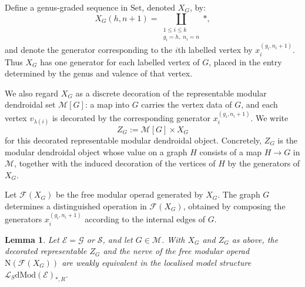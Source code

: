 \documentclass{amsart}
\newcommand{\bE}{\mathscr{E}}
\newcommand{\bM}{\mathscr{M}}
\newcommand{\sSet}{\mathscr{S}}
\newcommand{\Set}{\mathrm{Set}}
\newcommand{\Grpd}{\mathscr{G}}
\newcommand{\dMod}{\mathrm{dMod}}
\newcommand{\nerve}{\mathrm{N}}
\newtheorem{lemma}[theorem]{Lemma}%
\theoremstyle{definition}
\numberwithin{equation}{section}
\begin{document}
Define a genus-graded sequence in $\Set$, denoted $X_G$, by:
\[
X_G(h,n+1)
=
\coprod_{\substack{1\leq i\leq k\\ g_i=h,\; n_i=n}}
*,
\]
and denote the generator corresponding to the $i$th labelled vertex by $x_i^{(g_i,n_i+1)}$. Thus $X_G$ has one generator for each labelled vertex of $G$, placed in the entry determined by the genus and valence of that vertex.

We also regard $X_G$ as a discrete decoration of the representable modular dendroidal set $\bM[G]$: a map into $G$ carries the vertex data of $G$, and each vertex $v_{\lambda(i)}$ is decorated by the corresponding generator $x_i^{(g_i,n_i+1)}$. We write
\[
Z_G:=\bM[G]\times X_G
\]
for this decorated representable modular dendroidal object. Concretely, $Z_G$ is the modular dendroidal object whose value on a graph $H$ consists of a map $H\to G$ in $\bM$, together with the induced decoration of the vertices of $H$ by the generators of $X_G$.

Let $\mathcal F(X_G)$ be the free modular operad generated by $X_G$. The graph $G$ determines a distinguished operation in $\mathcal F(X_G)$, obtained by composing the generators $x_i^{(g_i,n_i+1)}$ according to the internal edges of $G$.

\begin{lemma}\label{lemma: nerve of free operad}
Let $\bE=\Grpd$ or $\sSet$, and let $G\in\bM$. With $X_G$ and $Z_G$ as above, the decorated representable $Z_G$ and the nerve of the free modular operad $\nerve(\mathcal F(X_G))$ are weakly equivalent in the localised model structure $\mathcal L_S\dMod(\bE)_{*,R}$.
\end{lemma}
\end{document}
